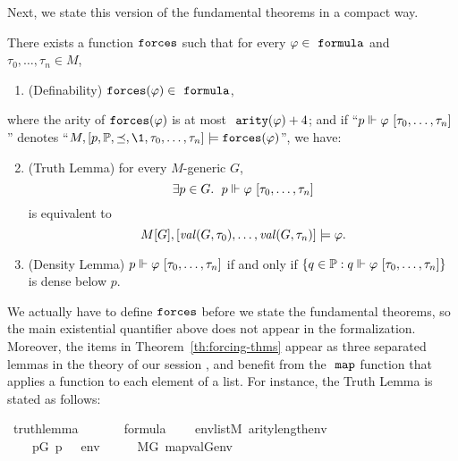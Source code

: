 Next, we state this version of the fundamental theorems in a compact
way.
\begin{theorem}\label{th:forcing-thms}
  There exists a function  $\mathop{\mathtt{forces}}$
  such that for every
  $\phi\in\formula$ and $\tau_0,\dots,\tau_n\in M$,
  \begin{enumerate}
  \item\label{item:definability} (Definability)
    $\forceisa(\phi)\in\formula$, 
  \end{enumerate}
  where the 
  arity of $\mathop{\mathtt{forces}}(\varphi)$ is at most $\isatt{arity}(\phi) + 4$; and if
  “$p \forces \phi\ [\tau_0,\dots,\tau_n]$”
  denotes
  “$M, [p,\PP,\preceq,\1, \tau_0,\dots,\tau_n]  \models
  \forceisa(\phi)$”, we have:
  \begin{enumerate}
    \setcounter{enumi}{1}
  \item\label{item:truth-lemma} (Truth Lemma) for every $M$-generic $G$,
    \[
      \exists p\in G.\ \; p \forces \phi\ [\tau_0,\dots,\tau_n]
    \]
    is equivalent to 
    \[
      M[G], [\operatorname{\mathit{val}}(G,\tau_0),\dots,\operatorname{\mathit{val}}(G,\tau_n)]
      \models \varphi.
    \]
  \item \label{item:density-lemma} (Density Lemma) $p \forces \phi\ [\tau_0,\dots,\tau_n]$
    if and only if 
    $\{q\in \PP :  q \forces \phi\ [\tau_0,\dots,\tau_n]\}$
    is dense below $p$.
  \end{enumerate}
\end{theorem}
We actually have to define $\mathop{\mathtt{forces}}$ before we state the fundamental
theorems, so the main existential quantifier above does not appear in the
formalization.
Moreover, the items in Theorem~\ref{th:forcing-thms} appear as three
separated lemmas in the theory
 of our
 session \cite{Independence_CH-AFP},
and benefit from the $\isatt{map}$ function that applies a function to
each element of a list. For instance, the Truth Lemma is stated as
follows:
\begin{isabelle}
\isamarkupfalse%
\ truth{\isacharunderscore}{\kern0pt}lemma{\isacharcolon}{\kern0pt}\isanewline
\ \ \isanewline
\ \ \ \ {\isachardoublequoteopen}{\isasymphi}{\isasymin}formula{\isachardoublequoteclose}\isanewline
\ \ \ \ {\isachardoublequoteopen}env{\isasymin}list{\isacharparenleft}{\kern0pt}M{\isacharparenright}{\kern0pt}{\isachardoublequoteclose}\ {\isachardoublequoteopen}arity{\isacharparenleft}{\kern0pt}{\isasymphi}{\isacharparenright}{\kern0pt}{\isasymle}length{\isacharparenleft}{\kern0pt}env{\isacharparenright}{\kern0pt}{\isachardoublequoteclose}\isanewline
\ \ \isanewline
\ \ \ \ {\isachardoublequoteopen}{\isacharparenleft}{\kern0pt}{\isasymexists}p{\isasymin}G{\isachardot}{\kern0pt}\ p\ {\isasymtturnstile}\ {\isasymphi}\ env{\isacharparenright}{\kern0pt}\ \ \ {\isasymlongleftrightarrow}\ \ \ M{\isacharbrackleft}{\kern0pt}G{\isacharbrackright}{\kern0pt}{\isacharcomma}{\kern0pt}\ map{\isacharparenleft}{\kern0pt}val{\isacharparenleft}{\kern0pt}G{\isacharparenright}{\kern0pt}{\isacharcomma}{\kern0pt}env{\isacharparenright}{\kern0pt}\ {\isasymTurnstile}\ {\isasymphi}{\isachardoublequoteclose}
\end{isabelle}
